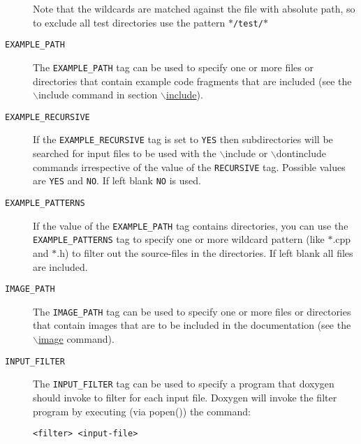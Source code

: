 \begin{description}
Note that the wildcards are matched against the file with absolute path, so to exclude all test directories use the pattern {\tt $\ast$}{\tt /test/}{\tt $\ast$}

\label{config_cfg_example_path}
\hypertarget{config_cfg_example_path}{}
 \item[{\tt EXAMPLE\_\-PATH} ] The {\tt EXAMPLE\_\-PATH} tag can be used to specify one or more files or directories that contain example code fragments that are included (see the $\backslash$include command in section \hyperlink{commands_cmdinclude}{$\backslash$include}).

\label{config_cfg_example_recursive}
\hypertarget{config_cfg_example_recursive}{}
 \item[{\tt EXAMPLE\_\-RECURSIVE} ] If the {\tt EXAMPLE\_\-RECURSIVE} tag is set to {\tt YES} then subdirectories will be searched for input files to be used with the $\backslash$include or $\backslash$dontinclude commands irrespective of the value of the {\tt RECURSIVE} tag. Possible values are {\tt YES} and {\tt NO}. If left blank {\tt NO} is used.

\label{config_cfg_example_patterns}
\hypertarget{config_cfg_example_patterns}{}
 \item[{\tt EXAMPLE\_\-PATTERNS} ] If the value of the {\tt EXAMPLE\_\-PATH} tag contains directories, you can use the {\tt EXAMPLE\_\-PATTERNS} tag to specify one or more wildcard pattern (like $\ast$.cpp and $\ast$.h) to filter out the source-files in the directories. If left blank all files are included.

\label{config_cfg_image_path}
\hypertarget{config_cfg_image_path}{}
 \item[{\tt IMAGE\_\-PATH} ] The {\tt IMAGE\_\-PATH} tag can be used to specify one or more files or directories that contain images that are to be included in the documentation (see the \hyperlink{commands_cmdimage}{$\backslash$image} command).

\label{config_cfg_input_filter}
\hypertarget{config_cfg_input_filter}{}
 \item[{\tt INPUT\_\-FILTER} ] The {\tt INPUT\_\-FILTER} tag can be used to specify a program that doxygen should invoke to filter for each input file. Doxygen will invoke the filter program by executing (via popen()) the command: 

\footnotesize\begin{verbatim}<filter> <input-file>
\end{verbatim}
\normalsize



\end{description}
